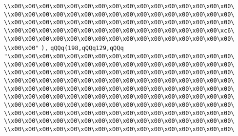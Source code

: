 \verb|\\x00\x00\x00\x00\x00\x00\x00\x00\x00\x00\x00\x00\x00\x00\x00\x00\|\newline
\verb|\\x00\x00\x00\x00\x00\x00\x00\x00\x00\x00\x00\x00\x00\x00\x00\x00\|\newline
\verb|\\x00\x00\x00\x00\x00\x00\x00\x00\x00\x00\x00\x00\x00\x00\x00\x00\|\newline
\verb|\\x00\x00\x00\x00\x00\x00\x00\x00\x00\x00\x00\x00\x00\x00\x00\xc6\|\newline
\verb|\\x00\x00\x00\x00\x00\x00\x00\x00\x00\x00\x00\x00\x00\x00\x00\x00\|\newline
\verb|\\x00\x00"|\newline
\verb|),|\newline
\verb|qQQq(198,qQQq129,qQQq|\newline
\verb|"\x00\x00\x00\x00\x00\x00\x00\x00\x00\x00\x00\x00\x00\x00\x00\x00\|\newline
\verb|\\x00\x00\x00\x00\x00\x00\x00\x00\x00\x00\x00\x00\x00\x00\x00\x00\|\newline
\verb|\\x00\x00\x00\x00\x00\x00\x00\x00\x00\x00\x00\x00\x00\x00\x00\x00\|\newline
\verb|\\x00\x00\x00\x00\x00\x00\x00\x00\x00\x00\x00\x00\x00\x00\x00\x00\|\newline
\verb|\\x00\x00\x00\x00\x00\x00\x00\x00\x00\x00\x00\x00\x00\x00\x00\x00\|\newline
\verb|\\x00\x00\x00\x00\x00\x00\x00\x00\x00\x00\x00\x00\x00\x00\x00\x00\|\newline
\verb|\\x00\x00\x00\x00\x00\x00\x00\x00\x00\x00\x00\x00\x00\x00\x00\x00\|\newline
\verb|\\x00\x00\x00\x00\x00\x00\x00\x00\x00\x00\x00\x00\x00\x00\x00\x00\|\newline
\verb|\\x00\x00\x00\x00\x00\x00\x00\x00\x00\x00\x00\x00\x00\x00\x00\x00\|\newline
\verb|\\x00\x00\x00\x00\x00\x00\x00\x00\x00\x00\x00\x00\x00\x00\x00\x00\|\newline
